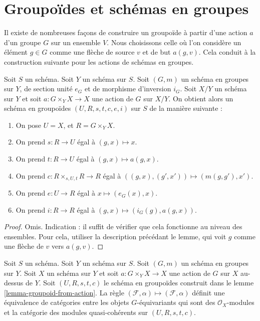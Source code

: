 \section{Groupoïdes et schémas en groupes}
\label{section-groupoids-group-schemes}

\noindent
Il existe de nombreuses façons de construire un groupoïde à partir d'une action $a$
d'un groupe $G$ sur un ensemble $V$. Nous choisissons celle où l'on considère
un élément $g \in G$ comme une flèche de source $v$ et de but $a(g, v)$.
Cela conduit à la construction suivante pour les actions de schémas en
groupes.

\begin{lemma}
\label{lemma-groupoid-from-action}
Soit $S$ un schéma.
Soit $Y$ un schéma sur $S$.
Soit $(G, m)$ un schéma en groupes sur $Y$, de
section unité $e_G$ et de morphisme d'inversion $i_G$.
Soit $X/Y$ un schéma sur $Y$ et soit $a : G \times_Y X \to X$
une action de $G$ sur $X/Y$.
On obtient alors un schéma en groupoïdes $(U, R, s, t, c, e, i)$ sur $S$
de la manière suivante :
\begin{enumerate}
\item On pose $U = X$, et $R = G \times_Y X$.
\item On prend $s : R \to U$ égal à $(g, x) \mapsto x$.
\item On prend $t : R \to U$ égal à $(g, x) \mapsto a(g, x)$.
\item On prend $c : R \times_{s, U, t} R \to R$ égal à
$((g, x), (g', x')) \mapsto (m(g, g'), x')$.
\item On prend $e : U \to R$ égal à $x \mapsto (e_G(x), x)$.
\item On prend $i : R \to R$ égal à $(g, x) \mapsto (i_G(g), a(g, x))$.
\end{enumerate}
\end{lemma}

\begin{proof}
Omis. Indication : il suffit de vérifier que cela fonctionne au niveau
des ensembles. Pour cela, utiliser la description précédant le lemme, qui voit
$g$ comme une flèche de $v$ vers $a(g, v)$.
\end{proof}

\begin{lemma}
\label{lemma-action-groupoid-modules}
Soit $S$ un schéma.
Soit $Y$ un schéma sur $S$.
Soit $(G, m)$ un schéma en groupes sur $Y$.
Soit $X$ un schéma sur $Y$ et soit $a : G \times_Y X \to X$
une action de $G$ sur $X$ au-dessus de $Y$. Soit $(U, R, s, t, c)$
le schéma en groupoïdes construit dans le lemme \ref{lemma-groupoid-from-action}.
La règle
$(\mathcal{F}, \alpha) \mapsto (\mathcal{F}, \alpha)$ définit
une équivalence de catégories entre les objets $G$-équivariants qui sont des
$\mathcal{O}_X$-modules et la catégorie des modules quasi-cohérents
sur $(U, R, s, t, c)$.
\end{lemma}


